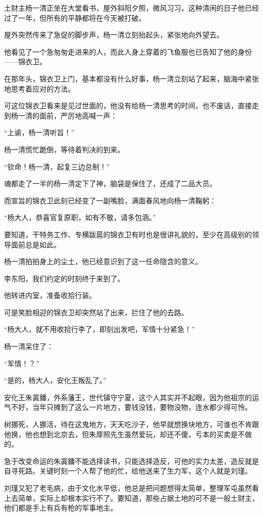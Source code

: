 \begin{multicols}{\theparacolNo}
土财主杨一清正坐在大堂看书，屋外斜阳夕照，微风习习，这种清闲的日子他已经过了一年，但所有的平静都将在今天被打破。

屋外突然传来了急促的脚步声，杨一清立刻抬起头，紧张地向外望去。

他看见了一个急匆匆走进来的人，而此人身上穿着的飞鱼服也已告知了他的身份——锦衣卫。

在那年头，锦衣卫上门，基本都没有什么好事，杨一清立刻站了起来，脑海中紧张地思考着应对的方法。

可这位锦衣卫看来是见过世面的，他没有给杨一清思考的时间，也不废话，直接走到杨一清的面前，严厉地高喊一声：

“上谕，杨一清听旨！”

杨一清慌忙跪倒，等待着判决的到来。

“钦命！杨一清，起复三边总制！”

魂都走了一半的杨一清定下了神，脑袋是保住了，还成了二品大员。

而宣旨的锦衣卫此刻已经变了一副嘴脸，满面春风地向杨一清鞠躬：

“杨大人，恭喜官复原职，如有不敬，请多包涵。”

要知道，干特务工作、专横跋扈的锦衣卫有时也是很讲礼貌的，至少在高级别的领导面前总是如此。

杨一清拍拍身上的尘土，他已经意识到了这一任命隐含的意义。

李东阳，我们约定的时刻终于来到了。

他转进内室，准备收拾行装。

可是笑脸相迎的锦衣卫却突然站了出来，拦住了他的去路。

“杨大人，就不用收拾行李了，即刻出发吧，军情十分紧急！”

杨一清呆住了：

“军情！？”

“是的，杨大人，安化王叛乱了。”

安化王朱寘鐇，外系藩王，世代镇守宁夏，这个人其实并不起眼，因为他祖宗的运气不好，当年只摊到了这么一片地方，要钱没钱，要物没物，连水都少得可怜。

树挪死，人挪活，待在这鬼地方，天天吃沙子，他早就想换块地方，可谁也不肯跟他换，他也想到北京去，但朱厚照先生虽然爱玩，却还不傻，亏本的买卖是不做的。

急于改变命运的朱寘鐇不能选择读书，只能选择造反，可他的实力太差，造反就是自寻死路。关键时刻一个人帮了他的忙，给他送来了生力军，这个人就是刘瑾。

刘瑾又犯了老毛病，由于文化水平低，他总是把问题想得太简单，整理军屯虽然看上去简单，实际上却根本实行不了。要知道，那些占据土地的可不是一般土财主，他们都是手上有兵有枪的军事地主。


\end{multicols}
